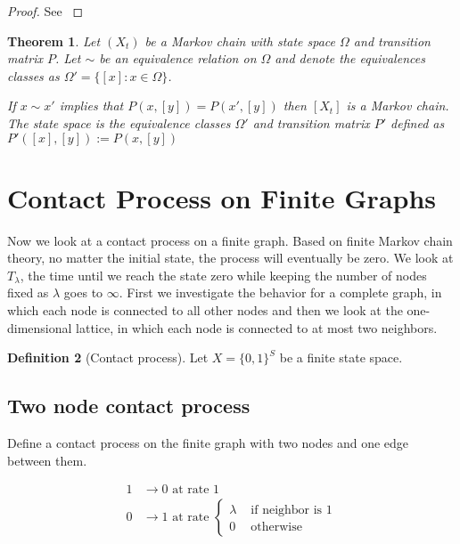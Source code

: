 \documentclass{article}
\theoremstyle{plain}
\newtheorem{theorem}{Theorem}[section]
\theoremstyle{definition}
\newtheorem{defn}[theorem]{Definition}
\theoremstyle{remark}
\begin{document}
\begin{proof}
See \cite{grinstead2003}
\end{proof}

\begin{theorem}\label{thm:mc_projection} \cite{LevinPeresWilmer2006}
Let $(X_t)$ be a Markov chain with state space $\Omega$ and transition matrix $P$.
Let $\sim$ be an equivalence relation on $\Omega$ and denote the equivalences classes as $\Omega' = \{[x]: x \in \Omega\}$.

If $x \sim x'$ implies that $P(x,[y]) = P(x', [y])$ then $[X_t]$  is a Markov chain.
The state space is the equivalence classes $\Omega'$ and transition matrix $P'$ defined as $P'([x],[y]) := P(x, [y])$
\end{theorem}

\section{Contact Process on Finite Graphs}

Now we look at a contact process on a finite graph.
Based on finite Markov chain theory, no matter the initial state, the process will eventually be zero.
We look at $T_\lambda$, the time until we reach the state zero while keeping the number of nodes fixed as $\lambda$ goes to $\infty$.
First we investigate the behavior for a complete graph, in which each node is connected to all other nodes and then we look at the one-dimensional lattice, in which each node is connected to at most two neighbors.

\begin{defn}[Contact process]
Let $X = \{0,1\}^S$ be a finite state space.
\end{defn}

\subsection{Two node contact process}

Define a contact process on the finite graph with two nodes and one edge between them.

\begin{align}
    1 &\to 0 \text{ at rate } 1\\
    0 &\to 1 \text{ at rate } \begin{cases}
        \lambda & \text{ if neighbor is 1}\\
        0 & \text{ otherwise}
    \end{cases}
\end{align}
\end{document}
